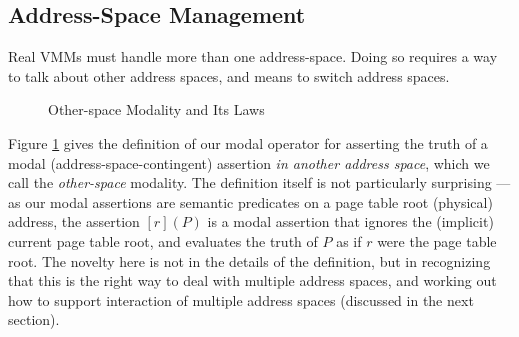 \subsection{Address-Space Management}
\label{sec:aspacemanagement}
Real VMMs must
 handle more than one address-space.
Doing so requires a way to talk about other address spaces, and means to switch address spaces.
\begin{figure}
\footnotesize
{}
\vspace{-1em}
  \caption{Other-space Modality and Its Laws}
  \label{fig:modaldef}
\vspace{-1em}
  \end{figure}
Figure \ref{fig:modaldef} gives the definition of our modal operator for asserting the truth of a modal
(address-space-contingent) assertion \emph{in another address space}, which we call
the \emph{other-space} modality. The definition itself is not
particularly surprising --- as our modal assertions are semantic predicates on a page table root (physical)
address, the assertion $[r](P)$ is a modal assertion that ignores the (implicit) current page table root,
and evaluates the truth of $P$ as if $r$ were the page table root. 
The novelty here is not in the details of the definition, but in recognizing that this is the right way to deal with
multiple address spaces, and working out how to support interaction of multiple address spaces (discussed in the next section).

